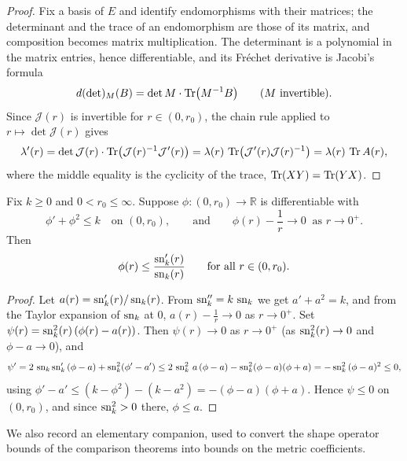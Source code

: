 \begin{proof}
\sketch
{}

Fix a basis of $E$ and identify endomorphisms with their matrices; the
determinant and the trace of an endomorphism are those of its matrix, and
composition becomes matrix multiplication. The determinant is a polynomial
in the matrix entries, hence differentiable, and its Fréchet derivative is
Jacobi's formula
$$d(\det)_M(B)=\det M\cdot\operatorname{Tr}\bigl(M^{-1}B\bigr)\qquad(M\ \text{invertible}).$$
Since ${\mathcal J}(r)$ is invertible for $r\in(0,r_0)$, the chain rule
applied to $r\mapsto\det{\mathcal J}(r)$ gives
$$\lambda'(r)=\det{\mathcal J}(r)\cdot
\operatorname{Tr}\bigl({\mathcal J}(r)^{-1}{\mathcal J}'(r)\bigr)
=\lambda(r)\,\operatorname{Tr}\bigl({\mathcal J}'(r){\mathcal J}(r)^{-1}\bigr)
=\lambda(r)\,\operatorname{Tr} A(r),$$
where the middle equality is the cyclicity of the trace,
$\operatorname{Tr}(XY)=\operatorname{Tr}(YX)$.
\end{proof}

\begin{lemma}
\label{lem:scalar-riccati-comparison}





Fix $k\ge 0$ and $0<r_0\le\infty$. Suppose $\phi\colon
(0,r_0)\to\mathbb{R}$ is differentiable with
$$\phi'+\phi^2\le k\quad\text{on }(0,r_0),\qquad\text{and}\qquad
\phi(r)-\frac1r\to0\ \text{ as } r\to0^+.$$
Then
$$\phi(r)\le\frac{\operatorname{sn}_k'(r)}{\operatorname{sn}_k(r)}\qquad\text{for all }r\in
(0,r_0).$$
\end{lemma}

\begin{proof}
\sketch
{}

Let $a(r)=\operatorname{sn}_k'(r)/\operatorname{sn}_k(r)$. From $\operatorname{sn}_k''=k\,\operatorname{sn}_k$ we get
$a'+a^2=k$, and from the Taylor expansion of $\operatorname{sn}_k$ at $0$,
$a(r)-\frac1r\to0$ as $r\to0^+$. Set
$\psi(r)=\operatorname{sn}_k^2(r)\left(\phi(r)-a(r)\right)$. Then
$\psi(r)\to0$ as $r\to0^+$ (as $\operatorname{sn}_k^2(r)\to 0$ and $\phi-a\to0$),
and
$$\psi'=2\,\operatorname{sn}_k\operatorname{sn}_k'\,(\phi-a)+\operatorname{sn}_k^2(\phi'-a')
\le 2\,\operatorname{sn}_k^2\,a\,(\phi-a)-\operatorname{sn}_k^2(\phi-a)(\phi+a)
=-\operatorname{sn}_k^2\,(\phi-a)^2\le0,$$
using $\phi'-a'\le(k-\phi^2)-(k-a^2)=-(\phi-a)(\phi+a)$. Hence
$\psi\le0$ on $(0,r_0)$, and since $\operatorname{sn}_k^2>0$ there,
$\phi\le a$.
\end{proof}

We also record an elementary companion, used to convert the shape
operator bounds of the comparison theorems into bounds on the metric
coefficients.

